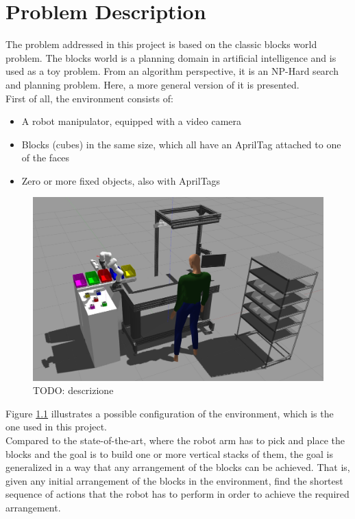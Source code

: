 \chapter{Problem Description} \label{cha:problem_description}

The problem addressed in this project is based on the classic blocks world problem\footnotemark{}. 
The blocks world is a planning domain in artificial intelligence and is used as a toy problem. From an algorithm perspective, it is an NP-Hard search and planning problem.
Here, a more general version of it is presented. \\
First of all, the environment consists of:
\begin{itemize}
	\item A robot manipulator, equipped with a video camera
	\item Blocks (cubes) in the same size, which all have an AprilTag \cite{olson2011tags, wang2016iros} attached to one of the faces
	\item Zero or more fixed objects, also with AprilTags
\end{itemize}

\begin{figure} [h]
\centering
\includegraphics[width=0.9
\textwidth]{figures/Magistrale/env_1_temp}
\caption[Environment Configuration]{ TODO: descrizione
\label{fig:env_1}}
\end{figure} 

Figure \ref{fig:env_1} illustrates a possible configuration of the environment, which is the one used in this project. \\
Compared to the state-of-the-art, where the robot arm has to pick and place the blocks and the goal is to build one or more vertical stacks of them, the goal is generalized in a way that any arrangement of the blocks can be achieved. 
That is, given any initial arrangement of the blocks in the environment, find the shortest sequence of actions that the robot has to perform in order to achieve the required arrangement. \\

